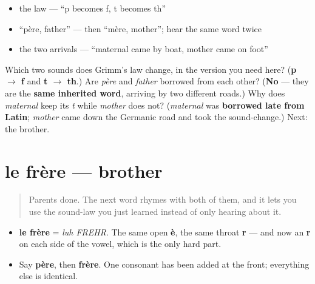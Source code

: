 \begin{itemize}
\raggedright
  \item the law — \textquotedblleft{}p becomes f, t becomes th\textquotedblright{}
  \item \textquotedblleft{}père, father\textquotedblright{} — then \textquotedblleft{}mère, mother\textquotedblright{}; hear the same word twice
  \item the two arrivals — \textquotedblleft{}maternal came by boat, mother came on foot\textquotedblright{}
\end{itemize}

\begin{tcolorbox}[breakable,colback=teal!4,colframe=teal!35!black,title={Before you move on}]
Which two sounds does Grimm's law change, in the version you need here? (\textbf{p $\to$ f} and \textbf{t $\to$ th}.) Are \emph{père} and \emph{father} borrowed from each other? (\textbf{No} — they are the \textbf{same inherited word}, arriving by two different roads.) Why does \emph{maternal} keep its \emph{t} while \emph{mother} does not? (\emph{maternal} was \textbf{borrowed late from Latin}; \emph{mother} came down the Germanic road and took the sound-change.) Next: the brother.
\end{tcolorbox}
\section[le frère]{le frère — brother}

\label{lesson:FR-C10-frere}



\begin{quote}
Parents done. The next word rhymes with both of them, and it lets you use the sound-law you just learned instead of only hearing about it.
\end{quote}

\begin{sounds}
\begin{itemize}
\raggedright
  \item \textbf{le frère} = \emph{luh FREHR}. The same open \textbf{è}, the same throat \textbf{r} — and now an \textbf{r} on each side of the vowel, which is the only hard part.
  \item Say \textbf{père}, then \textbf{frère}. One consonant has been added at the front; everything else is identical.
\end{itemize}
\end{sounds}

